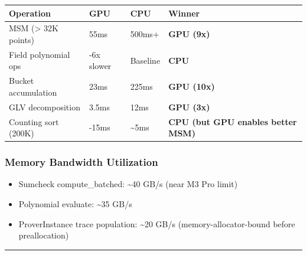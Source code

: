 \documentclass[
]{article}
\newcounter{none} %
\providecommand{\tightlist}{%
  \setlength{\itemsep}{0pt}\setlength{\parskip}{0pt}}
\begin{document}
{\def\LTcaptype{none} %
\begin{longtable}[]{@{}
  >{\raggedright\arraybackslash}p{}
  >{\raggedright\arraybackslash}p{}
  >{\raggedright\arraybackslash}p{}
  >{\raggedright\arraybackslash}p{}@{}}
\toprule\noalign{}
\begin{minipage}[b]{\linewidth}\raggedright
Operation
\end{minipage} & \begin{minipage}[b]{\linewidth}\raggedright
GPU
\end{minipage} & \begin{minipage}[b]{\linewidth}\raggedright
CPU
\end{minipage} & \begin{minipage}[b]{\linewidth}\raggedright
Winner
\end{minipage} \\
\midrule\noalign{}
\endhead
\bottomrule\noalign{}
\endlastfoot
MSM (\textgreater{} 32K points) & 55ms & 500ms+ & \textbf{GPU (9x)} \\
Field polynomial ops & 3-6x slower & Baseline & \textbf{CPU} \\
Bucket accumulation & 23ms & 225ms & \textbf{GPU (10x)} \\
GLV decomposition & 3.5ms & 12ms & \textbf{GPU (3x)} \\
Counting sort (200K) & 10-15ms & \textasciitilde5ms & \textbf{CPU (but
GPU enables better MSM)} \\
\end{longtable}
}

\subsubsection{Memory Bandwidth
Utilization}\label{memory-bandwidth-utilization}

\begin{itemize}
\tightlist
\item
  Sumcheck compute\_batched: \textasciitilde40 GB/s (near M3 Pro limit)
\item
  Polynomial evaluate: \textasciitilde35 GB/s
\item
  ProverInstance trace population: \textasciitilde20 GB/s
  (memory-allocator-bound before preallocation)
\end{itemize}

\begin{center}\rule{0.5\linewidth}{0.5pt}\end{center}
\end{document}
